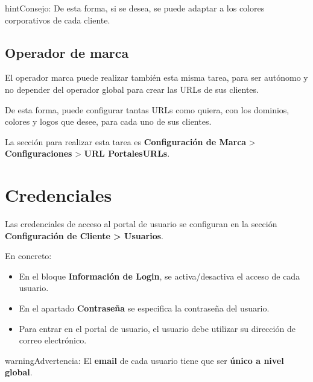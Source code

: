 \documentclass[letterpaper,10pt,spanish]{sphinxmanual}
\begin{document}
\begin{notice}{hint}{Consejo:}
De esta forma, si se desea,  se puede adaptar a los colores corporativos de cada cliente.
\end{notice}


\subsection{Operador de marca}
\label{user_portal/urls:brand-operator}
El operador marca puede realizar también esta misma tarea, para ser autónomo y no depender del operador global para crear las URLs de sus clientes.

De esta forma, puede configurar tantas URLs como quiera, con los dominios, colores y logos que desee, para cada uno de sus clientes.

La sección para realizar esta tarea es \textbf{Configuración de Marca} \textgreater{} \textbf{Configuraciones} \textgreater{} \textbf{URL PortalesURLs}.


\section{Credenciales}
\label{user_portal/credentials:credentials}\label{user_portal/credentials::doc}
Las credenciales de acceso al portal de usuario se configuran en la sección \textbf{Configuración de Cliente \textgreater{} Usuarios}.

En concreto:
\begin{itemize}
\item {} 
En el bloque \textbf{Información de Login}, se activa/desactiva el acceso de cada usuario.

\item {} 
En el apartado \textbf{Contraseña} se especifica la contraseña del usuario.

\item {} 
Para entrar en el portal de usuario, el usuario debe utilizar su dirección de correo electrónico.

\end{itemize}

\begin{notice}{warning}{Advertencia:}
El \textbf{email} de cada usuario tiene que ser \textbf{único a nivel global}.
\end{notice}
\end{document}
